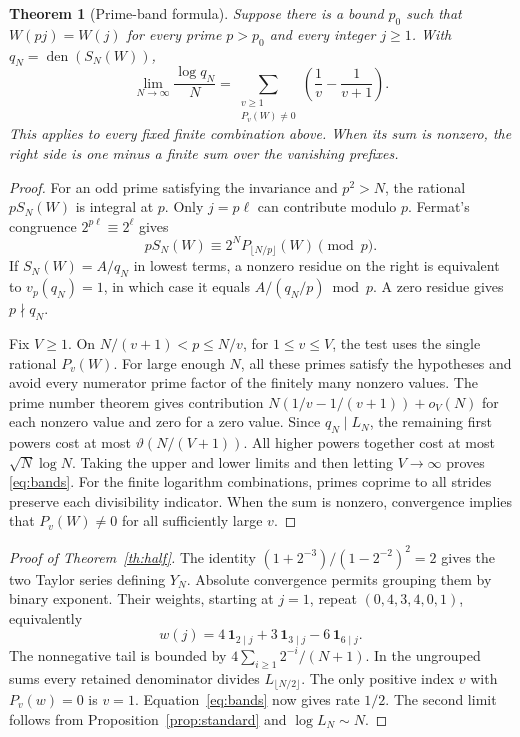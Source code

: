 \documentclass[11pt]{article}
\newtheorem{theorem}{Theorem}[section]
\DeclareMathOperator{\den}{den}
\newcommand{\ind}{\mathbf 1}
\begin{document}
\begin{theorem}[Prime-band formula]\label{th:bands}
Suppose there is a bound $p_0$ such that $W(pj)=W(j)$ for every prime $p>p_0$ and every integer $j\ge1$.
With $q_N=\den(S_N(W))$,
\begin{equation}
 \lim_{N\to\infty}\frac{\log q_N}{N}
  =\sum_{\substack{v\ge1\\P_v(W)\ne0}}\left(\frac1v-\frac1{v+1}\right).
 \label{eq:bands}
\end{equation}
This applies to every fixed finite combination above. When its sum is nonzero,
the right side is one minus a finite sum over the vanishing prefixes.
\end{theorem}
\begin{proof}
For an odd prime satisfying the invariance and $p^2>N$, the rational
$pS_N(W)$ is integral at $p$. Only $j=p\ell$ can contribute modulo $p$.
Fermat's congruence $2^{p\ell}\equiv2^\ell$ gives
\begin{equation}
 pS_N(W)\equiv 2^N P_{\lfloor N/p\rfloor}(W)\pmod p.
 \label{eq:prime}
\end{equation}
If $S_N(W)=A/q_N$ in lowest terms, a nonzero residue on the right is
equivalent to $v_p(q_N)=1$, in which case it equals $A/(q_N/p)\bmod p$.
A zero residue gives $p\nmid q_N$.

Fix $V\ge1$. On $N/(v+1)<p\le N/v$, for $1\le v\le V$, the test uses the
single rational $P_v(W)$. For large enough $N$, all these primes satisfy
the hypotheses and avoid every numerator prime factor of the finitely many
nonzero values. The prime number theorem gives contribution
$N(1/v-1/(v+1))+o_V(N)$ for each nonzero value and zero for a zero value.
Since $q_N\mid L_N$, the remaining first powers cost at most
$\vartheta(N/(V+1))$. All higher powers together cost at most $\sqrt N\log N$.
Taking the upper and lower limits and then letting $V\to\infty$ proves
\eqref{eq:bands}. For the finite logarithm combinations, primes coprime to all
strides preserve each divisibility indicator. When the sum is nonzero,
convergence implies that $P_v(W)\ne0$ for all sufficiently large $v$.
\end{proof}

\begin{proof}[Proof of Theorem~\ref{th:half}]
The identity $(1+2^{-3})/(1-2^{-2})^2=2$ gives the two Taylor series defining
$Y_N$. Absolute convergence permits grouping them by binary exponent. Their
weights, starting at $j=1$, repeat $(0,4,3,4,0,1)$, equivalently
\[
 w(j)=4\,\ind_{2\mid j}+3\,\ind_{3\mid j}-6\,\ind_{6\mid j}.
\]
The nonnegative tail is bounded by $4\sum_{i\ge1}2^{-i}/(N+1)$.
In the ungrouped sums every retained denominator divides $L_{\lfloor N/2\rfloor}$.
The only positive index $v$ with $P_v(w)=0$ is $v=1$.
Equation~\eqref{eq:bands} now gives rate $1/2$. The second limit follows from
Proposition~\ref{prop:standard} and $\log L_N\sim N$.
\end{proof}
\end{document}
